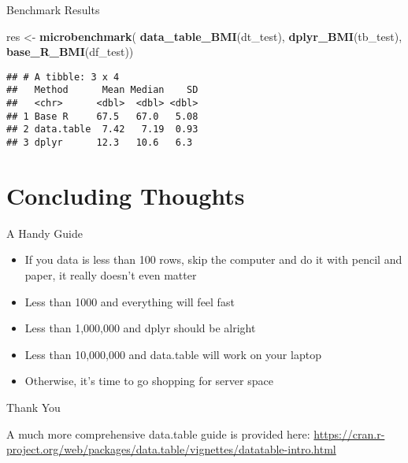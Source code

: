 \documentclass[ignorenonframetext,]{beamer}
\newenvironment{Shaded}{\begin{snugshade}}{\end{snugshade}}
\newcommand{\KeywordTok}[1]{\textcolor[rgb]{0.13,0.29,0.53}{\textbf{#1}}}
\newcommand{\NormalTok}[1]{#1}
\newcommand{\StringTok}[1]{\textcolor[rgb]{0.31,0.60,0.02}{#1}}
\providecommand{\tightlist}{%
  \setlength{\itemsep}{0pt}\setlength{\parskip}{0pt}}
\begin{document}
\begin{frame}[fragile]{Benchmark Results}
\protect\hypertarget{benchmark-results}{}

\begin{Shaded}
\begin{Highlighting}[]
\NormalTok{res <-}
\StringTok{  }\KeywordTok{microbenchmark}\NormalTok{(}
    \KeywordTok{data_table_BMI}\NormalTok{(dt_test),}
    \KeywordTok{dplyr_BMI}\NormalTok{(tb_test),}
    \KeywordTok{base_R_BMI}\NormalTok{(df_test))}
\end{Highlighting}
\end{Shaded}

\begin{verbatim}
## # A tibble: 3 x 4
##   Method      Mean Median    SD
##   <chr>      <dbl>  <dbl> <dbl>
## 1 Base R     67.5   67.0   5.08
## 2 data.table  7.42   7.19  0.93
## 3 dplyr      12.3   10.6   6.3
\end{verbatim}

\end{frame}

\hypertarget{concluding-thoughts}{%
\section{Concluding Thoughts}\label{concluding-thoughts}}

\begin{frame}{A Handy Guide}
\protect\hypertarget{a-handy-guide}{}

\begin{itemize}
\tightlist
\item
  If you data is less than 100 rows, skip the computer and do it with
  pencil and paper, it really doesn't even matter
\item
  Less than 1000 and everything will feel fast
\item
  Less than 1,000,000 and dplyr should be alright
\item
  Less than 10,000,000 and data.table will work on your laptop
\item
  Otherwise, it's time to go shopping for server space
\end{itemize}

\end{frame}

\begin{frame}{Thank You}
\protect\hypertarget{thank-you}{}

A much more comprehensive data.table guide is provided here:
\url{https://cran.r-project.org/web/packages/data.table/vignettes/datatable-intro.html}

\end{frame}
\end{document}
